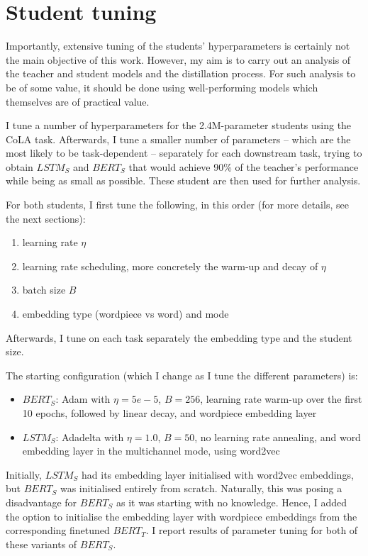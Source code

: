 \documentclass[bsc,frontabs,twoside,singlespacing,parskip,deptreport]{infthesis}
\begin{document}
\chapter{Student tuning}{
  Importantly, extensive tuning of the students' hyperparameters is certainly not the main objective of this work. However, my aim is to carry out an analysis of the teacher and student models and the distillation process. For such analysis to be of some value, it should be done using well-performing models which themselves are of practical value.

  I tune a number of hyperparameters for the 2.4M-parameter students using the CoLA task. Afterwards, I tune a smaller number of parameters -- which are the most likely to be task-dependent -- separately for each downstream task, trying to obtain $LSTM_S$ and $BERT_S$ that would achieve 90\% of the teacher's performance while being as small as possible. These student are then used for further analysis.

  For both students, I first tune the following, in this order (for more details, see the next sections):
  \begin{enumerate}
    \item learning rate $\eta$
    \item learning rate scheduling, more concretely the warm-up and decay of $\eta$
    \item batch size $B$
    \item embedding type (wordpiece vs word) and mode
  \end{enumerate}

  Afterwards, I tune on each task separately the embedding type and the student size.

  The starting configuration (which I change as I tune the different parameters) is:
  \begin{itemize}
    \item $BERT_S$: Adam with $\eta=5e-5$, $B=256$, learning rate warm-up over the first 10 epochs, followed by linear decay, and wordpiece embedding layer
    \item $LSTM_S$: Adadelta with $\eta=1.0$, $B=50$, no learning rate annealing, and word embedding layer in the multichannel mode, using word2vec
  \end{itemize}
  Initially, $LSTM_S$ had its embedding layer initialised with word2vec embeddings, but $BERT_S$ was initialised entirely from scratch. Naturally, this was posing a disadvantage for $BERT_S$ as it was starting with no knowledge. Hence, I added the option to initialise the embedding layer with wordpiece embeddings from the corresponding finetuned $BERT_T$. I report results of parameter tuning for both of these variants of $BERT_S$.
  
}
\end{document}
